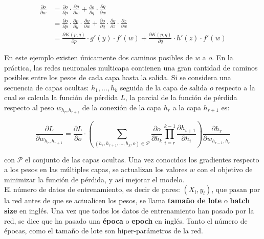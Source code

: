 \begin{align}
  \label{eq:ugly}
\frac{\partial o}{\partial w} &= \frac{\partial o}{\partial p} \cdot \frac{\partial p}{\partial w} +  \frac{\partial o}{\partial q} \cdot \frac{\partial q}{\partial w}  \\ 
                              &=  \frac{\partial o}{\partial p}\cdot\frac{\partial p}{\partial y}\cdot\frac{\partial y}{\partial w} + \frac{\partial o}{\partial q}\cdot \frac{\partial q}{\partial z}\cdot \frac{\partial z}{\partial w}\\
                              &= \frac{\partial K(p,q)}{\partial p}\cdot g'(y)\cdot f'(w) + \frac{\partial K(p,q)}{\partial q}\cdot h'(z)\cdot f'(w)
\end{align}

En este ejemplo existen únicamente dos caminos posibles de $w$ a $o$. En la práctica, las redes neuronales multicapa contienen una gran cantidad de caminos posibles entre los pesos de cada capa hasta la salida. Si se considera una secuencia de capas ocultas: $h_1,...,h_k$ seguida de la capa de salida $o$ respecto a la cual se calcula la función de pérdida $L$, la parcial de la función de pérdida respecto al peso $w_{h_r, h_{r+1}}$ de la conexión de la capa $h_{r}$ a la capa $h_{r+1}$ es: \cite{Nielsen:2018}

\begin{equation}
  \label{eq:partialw}
  \frac{\partial L}{\partial w_{h_r, h_{r+1}}} = \frac{\partial L}{\partial o}\cdot \left( \sum_{(h_r,h_{r+1},...,h_k,o)\in \mathcal{P}}\frac{\partial o}{\partial h_k}\prod_{i=r}^{k-1}\frac{\partial h_{i+1}}{\partial h_i}\right) \frac{\partial h_r}{\partial w_{h_{r-1},h_r}}
\end{equation}

con $\mathcal{P}$ el conjunto de las capas ocultas. Una vez conocidos los gradientes respecto a los pesos en las múltiples capas, se actualizan los valores $w$ con el objetivo de minimizar la función de pérdida, y así mejorar el modelo.\\
El número de datos de entrenamiento, es decir de pares: $(X_l,y_l)$, que pasan por la red antes de que se actualicen los pesos, se llama \textbf{tamaño de lote} o \textbf{batch size} en inglés. Una vez que todos los datos de entrenamiento han pasado por la red, se dice que ha pasado una \textbf{época} o \textbf{epoch} en inglés. Tanto el número de épocas, como el tamaño de lote son hiper-parámetros de la red.


